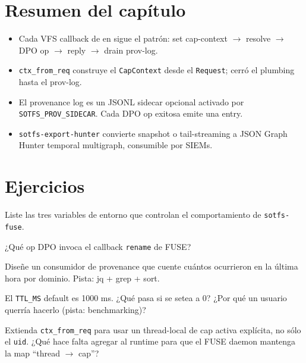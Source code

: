 \section{Resumen del capítulo}

\begin{itemize}
  \item Cada VFS callback de \fuse{} en  sigue el
    patrón: set cap-context $\to$ resolve $\to$ DPO op $\to$ reply
    $\to$ drain prov-log.
  \item \texttt{ctx\_from\_req} construye el \texttt{CapContext} desde
    el \texttt{Request};  cerró el plumbing
    hasta el prov-log.
  \item El provenance log es un JSONL sidecar opcional activado por
    \texttt{SOTFS\_PROV\_SIDECAR}. Cada DPO op exitosa emite una entry.
  \item \texttt{sotfs-export-hunter} convierte snapshot o tail-streaming
    a JSON Graph Hunter temporal multigraph, consumible por SIEMs.
\end{itemize}

\section*{Ejercicios}

\begin{ejercicio}[\dificultad{$\star$}]
\label{ej:fuse-1}
Liste las tres variables de entorno que controlan el comportamiento
de \texttt{sotfs-fuse}.
\end{ejercicio}

\begin{ejercicio}[\dificultad{$\star$}]
\label{ej:fuse-2}
¿Qué op DPO invoca el callback \texttt{rename} de FUSE?
\end{ejercicio}

\begin{ejercicio}[\dificultad{$\star\star$}]
\label{ej:fuse-3}
Diseñe un consumidor de provenance que cuente cuántos \opwrite{}
ocurrieron en la última hora por dominio. Pista: jq + grep + sort.
\end{ejercicio}

\begin{ejercicio}[\dificultad{$\star\star$}]
\label{ej:fuse-4}
El \texttt{TTL\_MS} default es 1000 ms. ¿Qué pasa si se setea a 0?
¿Por qué un usuario querría hacerlo (pista: benchmarking)?
\end{ejercicio}

\begin{ejercicio}[\dificultad{$\star\star\star$}]
\label{ej:fuse-5}
Extienda \texttt{ctx\_from\_req} para usar un thread-local de cap
activa explícita, no sólo el \texttt{uid}. ¿Qué hace falta agregar al
runtime para que el FUSE daemon mantenga la map ``thread $\to$ cap''?
\end{ejercicio}
